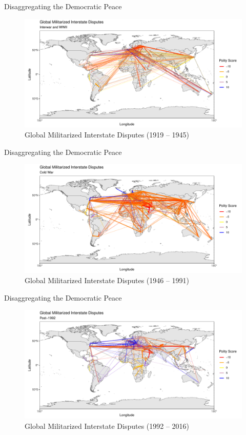 \documentclass{beamer}
\begin{document}
	\begin{frame}{Disaggregating the Democratic Peace}
	\begin{figure}
		\includegraphics[width=\linewidth]{data/output/plots/interwar.pdf}
		\caption{Global Militarized Interstate Disputes (1919 -- 1945)}
	\end{figure}
	\end{frame}

	\begin{frame}{Disaggregating the Democratic Peace}
	\begin{figure}
		\includegraphics[width=\linewidth]{data/output/plots/coldwar.pdf}
		\caption{Global Militarized Interstate Disputes (1946 -- 1991)}
	\end{figure}
	\end{frame}


	\begin{frame}{Disaggregating the Democratic Peace}
		\begin{figure}
			\includegraphics[width=\linewidth]{data/output/plots/post1992.pdf}
			\caption{Global Militarized Interstate Disputes (1992 -- 2016)}
		\end{figure}
	\end{frame}
\end{document}
